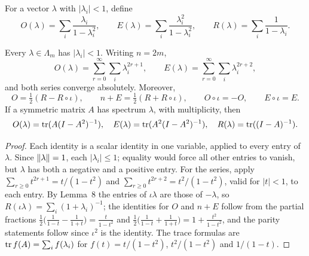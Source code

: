 \begin{definition}
\label{def:moment-statistics}
\leanok
For a vector $\lambda$ with $|\lambda_i|<1$, define
\[
 O(\lambda)=\sum_i\frac{\lambda_i}{1-\lambda_i^2},\qquad
 E(\lambda)=\sum_i\frac{\lambda_i^2}{1-\lambda_i^2},\qquad
 R(\lambda)=\sum_i\frac1{1-\lambda_i}.
\]
\end{definition}

\begin{lemma}
\label{lem:moment-identities}
\leanok
{}
Every $\lambda\in\Lambda_m$ has $|\lambda_i|<1$. Writing $n=2m$,
\[
 O(\lambda)=\sum_{r=0}^{\infty}\sum_i\lambda_i^{2r+1},\qquad
 E(\lambda)=\sum_{r=0}^{\infty}\sum_i\lambda_i^{2r+2},
\]
and both series converge absolutely. Moreover,
\[
 O=\tfrac12(R-R\circ\iota),\qquad
 n+E=\tfrac12(R+R\circ\iota),\qquad
 O\circ\iota=-O,\qquad E\circ\iota=E.
\]
If a symmetric matrix $A$ has spectrum $\lambda$, with multiplicity, then
\[
 O(\lambda)=\operatorname{tr}(A(I-A^2)^{-1}),\quad
 E(\lambda)=\operatorname{tr}(A^2(I-A^2)^{-1}),\quad
 R(\lambda)=\operatorname{tr}((I-A)^{-1}).
\]
\end{lemma}
\begin{proof}
\leanok
{}
Each identity is a scalar identity in one variable, applied to every
entry of $\lambda$. Since $\lVert \lambda\rVert=1$, each $|\lambda_i|\le1$;
equality would force all
other entries to vanish, but $\lambda$ has both a negative and a positive
entry. For the series, apply
$\sum_{r\ge0}t^{2r+1}=t/(1-t^2)$ and $\sum_{r\ge0}t^{2r+2}=t^2/(1-t^2)$,
valid for $|t|<1$, to each entry. By Lemma~8 the entries of
$\iota\lambda$ are those of $-\lambda$, so
$R(\iota\lambda)=\sum_i(1+\lambda_i)^{-1}$; the identities for $O$ and
$n+E$ follow from the partial fractions
$\tfrac12\bigl(\tfrac1{1-t}-\tfrac1{1+t}\bigr)=\tfrac t{1-t^2}$ and
$\tfrac12\bigl(\tfrac1{1-t}+\tfrac1{1+t}\bigr)=1+\tfrac{t^2}{1-t^2}$, and
the parity statements follow since $\iota^2$ is the identity. The trace
formulas are $\operatorname{tr} f(A)=\sum_if(\lambda_i)$ for
$f(t)=t/(1-t^2)$, $t^2/(1-t^2)$ and $1/(1-t)$.
\end{proof}

